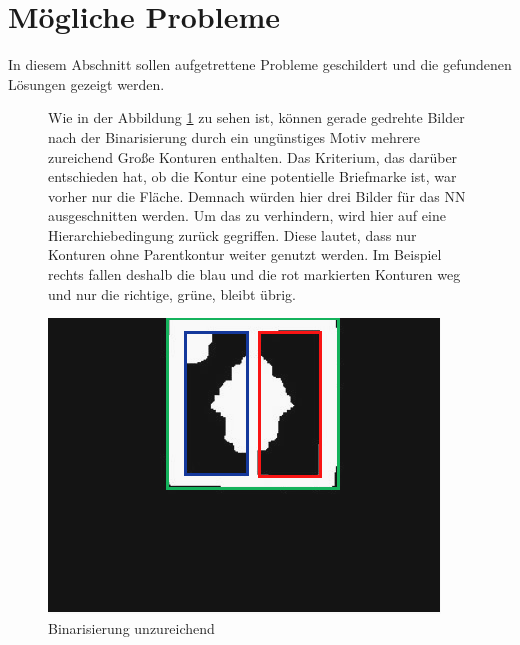 \documentclass[12pt,toc=bib,toc=listof]{scrreprt}
\begin{document}
\section{Mögliche Probleme}
\label{sec_bv:probleme}
In diesem Abschnitt sollen aufgetrettene Probleme geschildert und die gefundenen Lösungen gezeigt werden.\\

\begin{figure}[h]
\begin{minipage}[t]{.75\linewidth}

Wie in der Abbildung \ref{fig:bv_prob1} zu sehen ist, können gerade gedrehte Bilder nach der Binarisierung durch ein ungünstiges Motiv mehrere zureichend Große Konturen enthalten. Das Kriterium, das darüber entschieden hat, ob die Kontur eine potentielle Briefmarke ist, war vorher nur die Fläche. Demnach würden hier drei Bilder für das NN ausgeschnitten werden. Um das zu verhindern, wird hier auf eine Hierarchiebedingung zurück gegriffen. Diese lautet, dass nur Konturen ohne Parentkontur weiter genutzt werden. Im Beispiel rechts fallen deshalb die blau und die rot markierten Konturen weg und nur die richtige, grüne, bleibt übrig.
\end{minipage}
\hfill
\begin{minipage}[t]{.2\linewidth}
\strut\vspace*{-\baselineskip}
\newline
  \includegraphics[width=\linewidth]{./bilder/prob1_bin}
  \caption{Binarisierung unzureichend}
  \label{fig:bv_prob1}
\end{minipage}
\end{figure}
\end{document}
